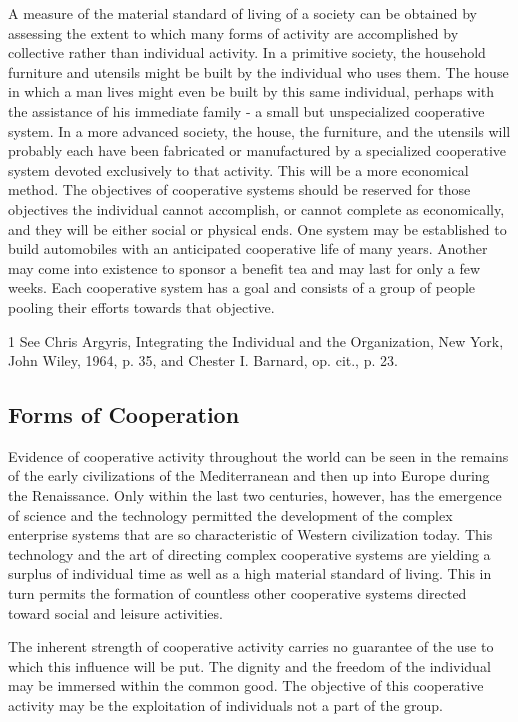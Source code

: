 A measure of the material standard of living of a society can be obtained by assessing the extent to which many forms of activity are accomplished by collective rather than individual activity. In a  primitive society, the household furniture and utensils might be built by the individual who uses them. The house in which a man lives might even be built by this same individual, perhaps with the assistance of his immediate family - a small but unspecialized cooperative system. In a more advanced society, the house, the furniture, and the utensils will probably each have been fabricated or manufactured by a specialized cooperative system devoted exclusively to that activity. This will be a more economical method. The objectives of cooperative systems should be reserved for those objectives the individual cannot accomplish, or cannot complete as economically, and they will be either social or physical ends. One system may be established to build automobiles with an anticipated cooperative life of many years. Another may come into existence to sponsor a benefit tea and may last for only a few weeks. Each cooperative system has a goal and consists of a group of people pooling their efforts towards that objective.

1 See Chris Argyris, Integrating the Individual and the Organization, New York, John Wiley, 1964, p. 35, and Chester I. Barnard, op. cit., p. 23.

\subsection{Forms of Cooperation}

Evidence of cooperative activity throughout the world can be seen in the remains of the early civilizations of the Mediterranean and then up into Europe during the Renaissance. Only within the last two centuries, however, has the emergence of science and the technology permitted the development of the complex enterprise systems that are so characteristic of Western civilization today. This technology and the art of directing complex cooperative systems are yielding a surplus of individual time as well as a high material standard of living. This in turn permits the formation of countless other cooperative systems directed toward social and leisure activities.

The inherent strength of cooperative activity carries no guarantee of the use to which this influence will be put. The dignity and the freedom of the individual may be immersed within the common good. The objective of this cooperative activity may be the exploitation of individuals not a part of the group.

